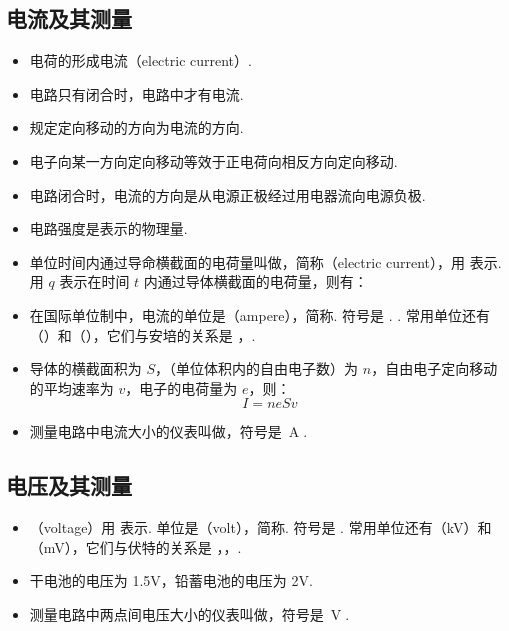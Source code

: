 \subsection{电流及其测量}
\vspace{10pt}
\begin{itemize}
\item 电荷的形成电流（electric current）.
\item 电路只有闭合时，电路中才有电流.
\item 规定定向移动的方向为电流的方向.
\item 电子向某一方向定向移动等效于正电荷向相反方向定向移动.
\item 电路闭合时，电流的方向是从电源正极经过用电器流向电源负极.
\item 电路强度是表示的物理量.
\item 单位时间内通过导命横截面的电荷量叫做，简称（electric current），用  表示. 用 $q$ 表示在时间 $t$ 内通过导体横截面的电荷量，则有：
\item 在国际单位制中，电流的单位是（ampere），简称. 符号是 . . 常用单位还有（）和（），它们与安培的关系是 ，.
\item 导体的横截面积为 $S$，（单位体积内的自由电子数）为 $n$，自由电子定向移动的平均速率为 $v$，电子的电荷量为 $e$，则：
$$
I=neSv
$$
\item 测量电路中电流大小的仪表叫做，符号是~{\Large\textcircled{\small A}}.
\end{itemize}

\subsection{电压及其测量}
\vspace{10pt}
\begin{itemize}
\item {}（voltage）用  表示. 单位是（volt），简称. 符号是 . 常用单位还有（kV）和（mV），它们与伏特的关系是 ，，.
\item 干电池的电压为 1.5V，铅蓄电池的电压为 2V.
\item 测量电路中两点间电压大小的仪表叫做，符号是~{\Large\textcircled{\small V}}.
\end{itemize}